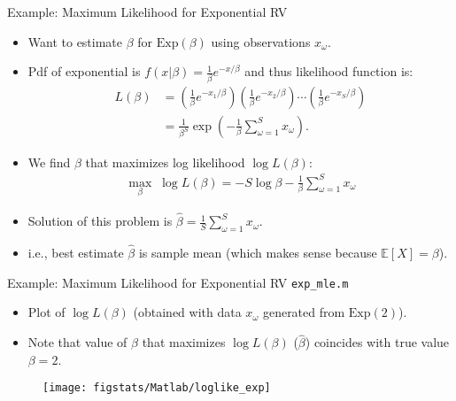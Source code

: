 \documentclass[9pt]{beamer}
\begin{document}
%
\begin{frame}{Example: Maximum Likelihood for Exponential RV}

\begin{itemize}
\item Want to estimate $\beta$ for $\textrm{Exp}(\beta)$ using observations $x_\omega$. 
\item Pdf of exponential is $f(x|\beta)=\frac{1}{\beta}e^{-x/\beta}$ and thus likelihood function is:
\begin{align*}
L(\beta)&=\left(\frac{1}{\beta}e^{-x_1/\beta}\right)\left(\frac{1}{\beta}e^{-x_2/\beta}\right)\cdots\left(\frac{1}{\beta}e^{-x_S/\beta}\right)\\
&=\frac{1}{\beta^S}\exp \left(-\frac{1}{\beta}\sum_{\omega=1}^Sx_\omega\right).
\end{align*}
\item We find $\beta$ that maximizes log likelihood $\log L(\beta)$:
\begin{align*}
\max_{\beta}\; \log L(\beta)=-S\log \beta -\frac{1}{\beta}\sum_{\omega=1}^Sx_\omega
\end{align*}
\item Solution of this problem is $\displaystyle\hat{\beta}=\frac{1}{S}\sum_{\omega=1}^Sx_\omega$.
\item i.e., best estimate $\hat{\beta}$ is sample mean (which makes sense because $\mathbb{E}[X]=\beta$). 
\end{itemize}


\end{frame}

%
\begin{frame}{Example: Maximum Likelihood for Exponential RV \footnotesize{\texttt{exp\_mle.m}}}

\begin{itemize}
\setlength{\itemsep}{5pt}
\item Plot of $\log L(\beta)$ (obtained with data $x_\omega$ generated from $\textrm{Exp}(2)$). 
\item Note that value of $\beta$ that maximizes $\log L(\beta)$ ($\hat{\beta}$) coincides with true value $\beta=2$. 
\end{itemize}
\begin{figure}[!htb]
    \centering
	\texttt{[image: figstats/Matlab/loglike\_exp]}
\end{figure}

\end{frame}
\end{document}
